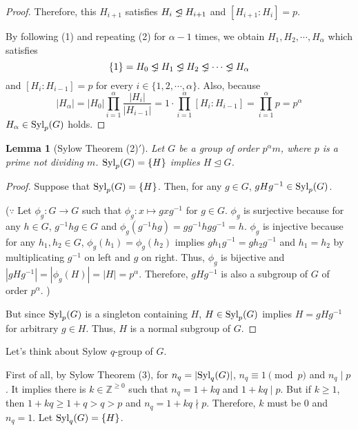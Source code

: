 \documentclass{article}
\newtheorem{lemma}{Lemma}
\newcommand{\triangleleftneq}{\mathrel{\ooalign{$\lneq$\cr\raise.22ex\hbox{$\lhd$}\cr}}}
\newcommand{\bbZ}{\mathbb{Z}}
\newcommand{\Syl}{\textnormal{Syl}}
\begin{document}
\begin{proof}
  Therefore, this \(H_{i + 1}\) satisfies \(H_i \triangleleftneq H_{i + 1}\) and \([H_{i + 1} : H_i] = p\).
  \newline

  By following (1) and repeating (2) for \(\alpha - 1\) times, we obtain \(H_1, H_2, \cdots, H_\alpha\) which satisfies
  \[\{1\} = H_0 \triangleleftneq H_1 \triangleleftneq H_2 \triangleleftneq \cdots \triangleleftneq H_\alpha\]
  and \([H_i : H_{i - 1}] = p\) for every \(i \in \{1, 2, \cdots, \alpha\}\).
  Also, because
  \[|H_\alpha| = |H_0|\prod_{i = 1}^{\alpha} \frac{|H_i|}{|H_{i - 1}|}
  = 1 \cdot \prod_{i = 1}^{\alpha} [H_i : H_{i - 1}] = \prod_{i = 1}^{\alpha} p
  = p^\alpha\]
  \(H_\alpha \in \Syl_p(G)\) holds.
\end{proof}

\begin{lemma}[Sylow Theorem (2)\('\)]\label{lem-syl-2}
  Let \(G\) be a group of order \(p^\alpha m\), where \(p\) is a prime not dividing \(m\). \(\Syl_p(G) = \{H\}\) implies \(H \trianglelefteq G\).
\end{lemma}
\begin{proof}
  Suppose that \(\Syl_p(G) = \{H\}\). Then, for any \(g \in G\), \(gHg^{-1} \in \Syl_p(G)\).

  (\(\because\)
  Let \(\phi_g: G \to G\) such that \(\phi_g: x \mapsto gxg^{-1}\) for \(g \in G\).
  \(\phi_g\) is surjective because for any \(h \in G\), \(g^{-1}hg \in G\) and \(\phi_g(g^{-1}hg) = gg^{-1}hgg^{-1} = h\).
  \(\phi_g\) is injective because for any \(h_1, h_2 \in G\), \(\phi_g(h_1) = \phi_g(h_2)\) implies \(gh_1g^{-1} = gh_2g^{-1}\) and \(h_1 = h_2\) by multiplicating \(g^{-1}\) on left and \(g\) on right.
  Thus, \(\phi_g\) is bijective and \(|gHg^{-1}| = |\phi_g(H)| = |H| = p^\alpha\).
  Therefore, \(gHg^{-1}\) is also a subgroup of \(G\) of order \(p^\alpha\).
  )

  But since \(\Syl_p(G)\) is a singleton containing \(H\), \(H \in \Syl_p(G)\) implies \(H = gHg^{-1}\) for arbitrary \(g \in H\). Thus, \(H\) is a normal subgroup of \(G\).
\end{proof}

Let's think about Sylow \(q\)-group of \(G\).

First of all, by Sylow Theorem (3), for \(n_q = |\Syl_q(G)|\), \(n_q \equiv 1 \pmod{p}\) and \(n_q \mid p\). It implies there is \(k \in \bbZ^{\ge 0}\) such that \(n_q = 1 + kq\) and \(1 + kq \mid p\). But if \(k \ge 1\), then \(1 + kq \ge 1 + q > q > p\) and \(n_q = 1 + kq \nmid p\). Therefore, \(k\) must be 0 and \(n_q = 1\). Let \(\Syl_q(G) = \{H\}\).
\end{document}
